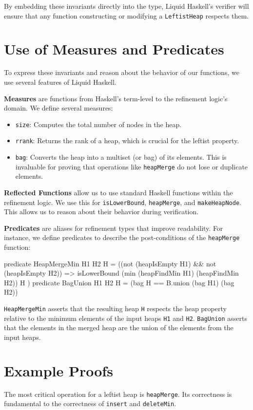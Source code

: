 By embedding these invariants directly into the type, Liquid Haskell's verifier will ensure that any function constructing or modifying a \texttt{LeftistHeap} respects them.

\section{Use of Measures and Predicates}
To express these invariants and reason about the behavior of our functions, we use several features of Liquid Haskell.

\textbf{Measures} are functions from Haskell's term-level to the refinement logic's domain. We define several measures:
\begin{itemize}
	\item \texttt{size}: Computes the total number of nodes in the heap.
	\item \texttt{rrank}: Returns the rank of a heap, which is crucial for the leftist property.
	\item \texttt{bag}: Converts the heap into a multiset (or bag) of its elements. This is invaluable for proving that operations like \texttt{heapMerge} do not lose or duplicate elements.
\end{itemize}

\textbf{Reflected Functions} allow us to use standard Haskell functions within the refinement logic. We use this for \texttt{isLowerBound}, \texttt{heapMerge}, and \texttt{makeHeapNode}. This allows us to reason about their behavior during verification.

\textbf{Predicates} are aliases for refinement types that improve readability. For instance, we define predicates to describe the post-conditions of the \texttt{heapMerge} function:
\begin{code}
 predicate HeapMergeMin H1 H2 H = 
    ((not (heapIsEmpty H1) && not (heapIsEmpty H2)) => 
    isLowerBound (min (heapFindMin H1) (heapFindMin H2)) H )
 predicate BagUnion H1 H2 H = 
    (bag H == B.union (bag H1) (bag H2))
\end{code}
\texttt{HeapMergeMin} asserts that the resulting heap \texttt{H} respects the heap property relative to the minimum elements of the input heaps \texttt{H1} and \texttt{H2}. \texttt{BagUnion} asserts that the elements in the merged heap are the union of the elements from the input heaps.

\section{Example Proofs}
The most critical operation for a leftist heap is \texttt{heapMerge}. Its correctness is fundamental to the correctness of \texttt{insert} and \texttt{deleteMin}.

